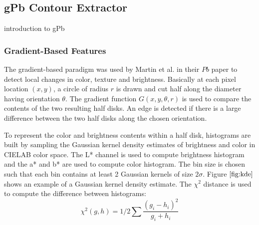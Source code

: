 \documentclass{SMBV12}
\begin{document}
\subsection{gPb Contour Extractor}
\label{sec:shape_feature}

introduction to gPb

\subsubsection{Gradient-Based Features}

\cite{maire2008using}



The gradient-based paradigm was used by Martin et al. in their $Pb$ paper \cite{martin2004learning} to detect local changes in color, texture and brightness. Basically at each pixel location $(x, y)$, a circle of radius $r$ is drawn and cut half along the diameter having orientation $\theta$. The gradient function $G(x, y, \theta, r)$ is used to compare the contents of the two resulting half disks. An edge is detected if there is a large difference between the two half disks along the chosen orientation.

To represent the color and brightness contents within a half disk, histograms are built by sampling the Gaussian kernel density estimates of brightness and color in CIELAB color space. The L* channel is used to compute brightness histogram and the a* and b* are used to compute color histogram. The bin size is chosen such that each bin contains at least 2 Gaussian kernels of size $2\sigma$. Figure $\ref{fig:kde}$ shows an example of a Gaussian kernel density estimate. The $\chi^2$ distance is used to compute the difference between histograms:
\begin{equation}
	\chi^2(g, h) = 1/2\sum \dfrac{(g_i - h_i)^2}{g_i + h_i}
\end{equation}
\end{document}
